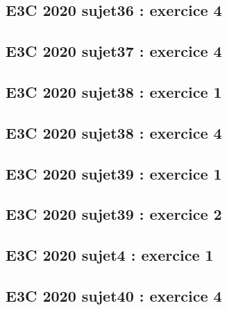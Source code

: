 \documentclass[lang=fr,edition=teacher,layout=sheet]{mxbook}
\begin{document}
\subsection*{E3C 2020 sujet36 : exercice 4}
\begingroup\endgroup
\par\bigskip
{}\subsection*{E3C 2020 sujet37 : exercice 4}
\begingroup\endgroup
\par\bigskip
{}\subsection*{E3C 2020 sujet38 : exercice 1}
\begingroup\endgroup
\par\bigskip
{}\subsection*{E3C 2020 sujet38 : exercice 4}
\begingroup\endgroup
\par\bigskip
{}\subsection*{E3C 2020 sujet39 : exercice 1}
\begingroup\endgroup
\par\bigskip
{}\subsection*{E3C 2020 sujet39 : exercice 2}
\begingroup\endgroup
\par\bigskip
{}\subsection*{E3C 2020 sujet4 : exercice 1}
\begingroup\endgroup
\par\bigskip
{}\subsection*{E3C 2020 sujet40 : exercice 4}
\end{document}
